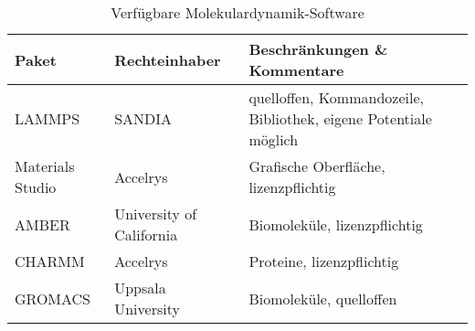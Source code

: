 \begin{table}
  \oddrowcolors
  \caption[Verfügbare Molekulardynamik-Software]{
    Verfügbare Molekulardynamik-Software
  }
  \label{tab:mdsoftware}
  \begin{tabularx}{\textwidth}{|llX|}
    \hline
    \textbf{Paket}                                                                                 & \textbf{Rechteinhaber}   & \textbf{Beschränkungen \& Kommentare}                                              \\
    \hline
    LAMMPS\cite{plimpton_lammps_2014}                                                              & SANDIA                   & quelloffen, Kommandozeile, Bibliothek, eigene Potentiale möglich \\
    Materials Studio\cite{accelrys_materials_2014}                                                 & Accelrys                 & Grafische Oberfläche, lizenzpflichtig                            \\
    AMBER\cite{case_amber_2014}                                                                    & University of California & Biomoleküle, lizenzpflichtig                                     \\
    CHARMM\cite{brooks_charmm_2014,brooks_charmm:_1983,mackerell_charmm:_2002,brooks_charmm:_2009} & Accelrys                 & Proteine, lizenzpflichtig                                        \\
    GROMACS\cite{lindahl_gromacs_2014}                                                             & Uppsala University       & Biomoleküle, quelloffen                                          \\
    \hline
  \end{tabularx}
\end{table}
